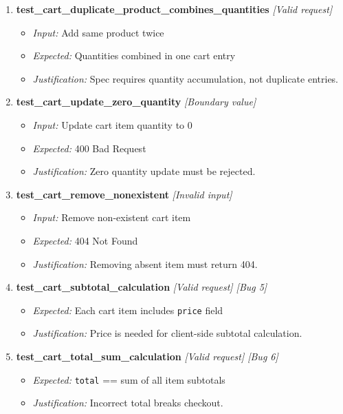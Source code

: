 \documentclass{article}
\begin{document}
\begin{enumerate}[resume, label=\textbf{TC\arabic*.}]
\item \textbf{test\_cart\_duplicate\_product\_combines\_quantities} \textit{[Valid request]}
\begin{itemize}[noitemsep]
  \item \textit{Input:} Add same product twice
  \item \textit{Expected:} Quantities combined in one cart entry
  \item \textit{Justification:} Spec requires quantity accumulation, not duplicate entries.
\end{itemize}

\item \textbf{test\_cart\_update\_zero\_quantity} \textit{[Boundary value]}
\begin{itemize}[noitemsep]
  \item \textit{Input:} Update cart item quantity to 0
  \item \textit{Expected:} 400 Bad Request
  \item \textit{Justification:} Zero quantity update must be rejected.
\end{itemize}

\item \textbf{test\_cart\_remove\_nonexistent} \textit{[Invalid input]}
\begin{itemize}[noitemsep]
  \item \textit{Input:} Remove non-existent cart item
  \item \textit{Expected:} 404 Not Found
  \item \textit{Justification:} Removing absent item must return 404.
\end{itemize}

\item \textbf{test\_cart\_subtotal\_calculation} \textit{[Valid request] \textit{[Bug 5]}}
\begin{itemize}[noitemsep]
  \item \textit{Expected:} Each cart item includes \texttt{price} field
  \item \textit{Justification:} Price is needed for client-side subtotal calculation.
\end{itemize}

\item \textbf{test\_cart\_total\_sum\_calculation} \textit{[Valid request] \textit{[Bug 6]}}
\begin{itemize}[noitemsep]
  \item \textit{Expected:} \texttt{total} == sum of all item subtotals
  \item \textit{Justification:} Incorrect total breaks checkout.
\end{itemize}


\end{enumerate}
\end{document}
